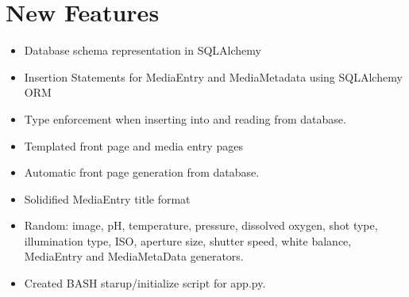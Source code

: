 \documentclass[12pt]{article}
\begin{document}
\section{New Features}
\begin{itemize}
	\item Database schema representation in SQLAlchemy
	\item Insertion Statements for MediaEntry and MediaMetadata using SQLAlchemy ORM
	\item Type enforcement when inserting into and reading from database.
	\item Templated front page and media entry pages
	\item Automatic front page generation from database.
	\item Solidified MediaEntry title format
	\item Random: image, pH, temperature, pressure, dissolved oxygen, shot type, illumination type, ISO, aperture size, shutter speed, white balance, MediaEntry and MediaMetaData generators.
	\item Created BASH starup/initialize script for app.py.
\end{itemize}
\end{document}
